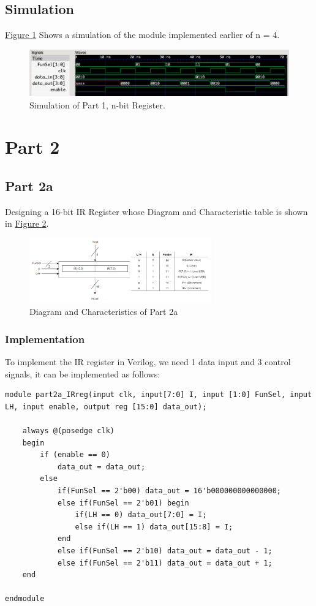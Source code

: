 \documentclass[pdftex,12pt,a4paper]{article}
\begin{document}
\subsection{Simulation}
\hyperref[fig:part1_sim]{Figure \ref{fig:part1_sim}} Shows a simulation of the module implemented earlier of n = 4.
\begin{figure}[H]
\centering
\includegraphics[width=1\textwidth]{part1_sim.png}
\caption{Simulation of Part 1, n-bit Register.}
\label{fig:part1_sim}
\end{figure}

\section{Part 2}

\subsection{Part 2a}
Designing a 16-bit IR Register whose Diagram and Characteristic table is shown in \hyperref[fig:part2a_diagram]{Figure \ref{fig:part2a_diagram}}.

\begin{figure}[H]
\centering
\includegraphics[width=0.7\textwidth]{part2a_diagram.png}
\caption{Diagram and Characteristics of Part 2a}
\label{fig:part2a_diagram}
\end{figure}

\subsubsection{Implementation}
To implement the IR register in Verilog, we need 1 data input and 3 control signals, it can be implemented as follows:

\begin{lstlisting}
module part2a_IRreg(input clk, input[7:0] I, input [1:0] FunSel, input LH, input enable, output reg [15:0] data_out);

    always @(posedge clk)
    begin
        if (enable == 0)
            data_out = data_out;
        else
            if(FunSel == 2'b00) data_out = 16'b000000000000000;
            else if(FunSel == 2'b01) begin
                if(LH == 0) data_out[7:0] = I;
                else if(LH == 1) data_out[15:8] = I;
            end
            else if(FunSel == 2'b10) data_out = data_out - 1;
            else if(FunSel == 2'b11) data_out = data_out + 1;
    end

endmodule
\end{lstlisting}
\end{document}
